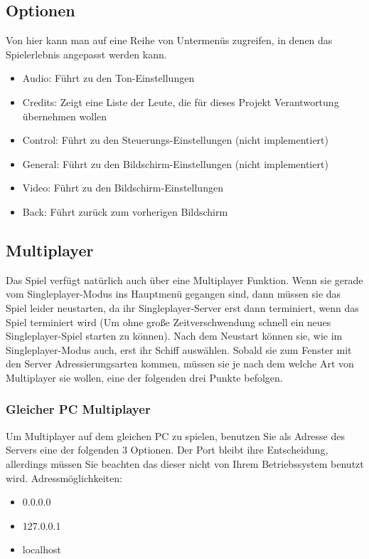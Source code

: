 \documentclass[fontsize=12pt,paper=a4,twoside]{scrartcl}
\begin{document}
\subsection{Optionen}
Von hier kann man auf eine Reihe von Untermenüs zugreifen, in denen das Spielerlebnis angepasst werden kann.
\begin{itemize}
\item Audio: Führt zu den Ton-Einstellungen
\item Credits: Zeigt eine Liste der Leute, die für dieses Projekt Verantwortung übernehmen wollen
\item Control: Führt zu den Steuerungs-Einstellungen (nicht implementiert)
\item General: Führt zu den Bildschirm-Einstellungen (nicht implementiert)
\item Video: Führt zu den Bildschirm-Einstellungen
\item Back: Führt zurück zum vorherigen Bildschirm
\end{itemize}




\subsection{Multiplayer}

Das Spiel verfügt natürlich auch über eine Multiplayer Funktion. Wenn sie gerade vom Singleplayer-Modus ins Hauptmenü gegangen sind, dann müssen sie das Spiel leider neustarten, da ihr Singleplayer-Server erst dann terminiert, wenn das Spiel terminiert wird (Um ohne große Zeitverschwendung schnell ein neues Singleplayer-Spiel starten zu können). Nach dem Neustart können sie, wie im Singleplayer-Modus auch, erst ihr Schiff auswählen. Sobald sie zum Fenster mit den Server Adressierungsarten kommen, müssen sie je nach dem welche Art von Multiplayer sie wollen, eine der folgenden drei Punkte befolgen.

\subsubsection{Gleicher PC Multiplayer}
Um Multiplayer auf dem gleichen PC zu spielen, benutzen Sie als Adresse des Servers eine der folgenden 3 Optionen. Der Port bleibt ihre Entscheidung, allerdings müssen Sie beachten das dieser nicht von Ihrem Betriebssystem benutzt wird. 
Adressmöglichkeiten:
\begin{itemize}
\item 0.0.0.0
\item 127.0.0.1
\item localhost
\end{itemize}
\end{document}
